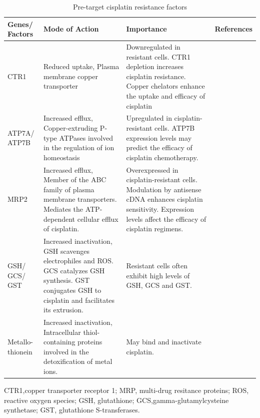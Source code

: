 \begin{table}[htbp]
   \centering
   \caption{Pre-target cisplatin resistance factors}
\begin{tabular}{p{1.5cm}p{5cm}p{5cm}p{1cm}}
\hline
\textbf{Genes/ Factors} & \multicolumn{1}{l}{ \textbf{Mode of Action}} & \multicolumn{1}{p{5cm}}{ \textbf{Importance}} & \multicolumn{1}{p{5cm}}{ \textbf{References}} \\ \hline

CTR1   & Reduced uptake, Plasma membrane copper transporter & Downregulated in resistant cells. CTR1 depletion increases cisplatin resistance. Copper chelators enhance the uptake and efficacy of cisplatin & \multicolumn{1}{p{5cm}}{ \cite{more2010role, ishida2010enhancing,holzer2006contribution,katano2002acquisition}} \\

ATP7A/ ATP7B & Increased efflux, Copper-extruding P-type ATPases involved in the regulation of ion homeostasis & Upregulated in cisplatin-resistant cells. ATP7B expression levels may predict the efficacy of cisplatin chemotherapy.  & \multicolumn{1}{p{5cm}}{\cite{katano2002acquisition,komatsu2000copper,nakayama2002copper,safaei2004role,aida2005expression}} \\ 

MRP2   & Increased efflux, Member of the ABC family of plasma membrane transporters. Mediates the ATP-dependent cellular efflux of cisplatin. & Overexpressed in cisplatin-resistant cells. Modulation by antisense cDNA enhances cisplatin sensitivity. Expression levels affect the efficacy of cisplatin regimens. & \multicolumn{1}{p{5cm}}{\cite{cui1999drug,korita2010multidrug,liedert2003overexpression, yamasaki2011role}} \\

GSH/ GCS/ GST & Increased inactivation, GSH scavenges electrophiles and ROS. GCS catalyzes GSH synthesis. GST conjugates GSH to cisplatin and facilitates its extrusion. & Resistant cells often exhibit high levels of GSH, GCS and GST.  & \multicolumn{1}{p{5cm}}{\cite{lewis1988glutathione,chen2010role}} \\

Metallo-thionein & Increased inactivation, Intracellular thiol-containing proteins involved in the detoxification of metal ions. & May bind and inactivate cisplatin.  & \multicolumn{1}{p{5cm}}{\cite{kelley1988overexpression,kasahara1991metallothionein}} \\   \hline
\end{tabular}%
\begin{tablenotes}
\small
      \item  {CTR1,copper transporter receptor 1; MRP, multi-drug resitance proteins; ROS, reactive oxygen species; GSH, glutathione; GCS,gamma-glutamylcysteine synthetase; GST, glutathione S-transferases}.
    \end{tablenotes}
 
   \label{tab:addlabel}%
 \end{table}%


